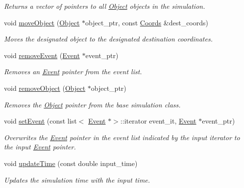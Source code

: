 \begin{DoxyCompactItemize}
\begin{DoxyCompactList}\small\item\em Returns a vector of pointers to all \hyperlink{class_object}{Object} objects in the simulation. \end{DoxyCompactList}\item 
void \hyperlink{class_simulation_a7b10f51640088366d0d1278361817e8d}{move\+Object} (\hyperlink{class_object}{Object} $\ast$object\+\_\+ptr, const \hyperlink{struct_coords}{Coords} \&dest\+\_\+coords)
\begin{DoxyCompactList}\small\item\em Moves the designated object to the designated destination coordinates. \end{DoxyCompactList}\item 
void \hyperlink{class_simulation_a3a4808231d4760f0ab30ea39b6a67e8c}{remove\+Event} (\hyperlink{class_event}{Event} $\ast$event\+\_\+ptr)
\begin{DoxyCompactList}\small\item\em Removes an \hyperlink{class_event}{Event} pointer from the event list. \end{DoxyCompactList}\item 
void \hyperlink{class_simulation_a39da17feb9b487c05c9a834def44972f}{remove\+Object} (\hyperlink{class_object}{Object} $\ast$object\+\_\+ptr)
\begin{DoxyCompactList}\small\item\em Removes the \hyperlink{class_object}{Object} pointer from the base simulation class. \end{DoxyCompactList}\item 
void \hyperlink{class_simulation_a122928940c1301d71f19700b574f9e37}{set\+Event} (const list$<$ \hyperlink{class_event}{Event} $\ast$$>$\+::iterator event\+\_\+it, \hyperlink{class_event}{Event} $\ast$event\+\_\+ptr)
\begin{DoxyCompactList}\small\item\em Overwrites the \hyperlink{class_event}{Event} pointer in the event list indicated by the input iterator to the input \hyperlink{class_event}{Event} pointer. \end{DoxyCompactList}\item 
void \hyperlink{class_simulation_a1affa7d0725c3d10663095619dcb9208}{update\+Time} (const double input\+\_\+time)
\begin{DoxyCompactList}\small\item\em Updates the simulation time with the input time. \end{DoxyCompactList}\end{DoxyCompactItemize}
